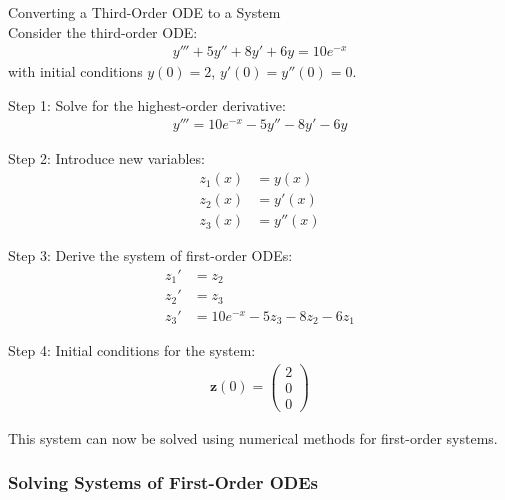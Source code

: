 \begin{example2}{Converting a Third-Order ODE to a System}\\
Consider the third-order ODE:
\begin{align*}
y''' + 5y'' + 8y' + 6y = 10e^{-x}
\end{align*}
with initial conditions $y(0) = 2$, $y'(0) = y''(0) = 0$.

Step 1: Solve for the highest-order derivative:
\begin{align*}
y''' = 10e^{-x} - 5y'' - 8y' - 6y
\end{align*}

Step 2: Introduce new variables:
\begin{align*}
z_1(x) &= y(x)\\
z_2(x) &= y'(x)\\
z_3(x) &= y''(x)
\end{align*}

Step 3: Derive the system of first-order ODEs:
\begin{align*}
z_1' &= z_2\\
z_2' &= z_3\\
z_3' &= 10e^{-x} - 5z_3 - 8z_2 - 6z_1
\end{align*}

Step 4: Initial conditions for the system:
\begin{align*}
\mathbf{z}(0) = \begin{pmatrix} 2 \\ 0 \\ 0 \end{pmatrix}
\end{align*}

This system can now be solved using numerical methods for first-order systems.
\end{example2}

\subsubsection{Solving Systems of First-Order ODEs}


